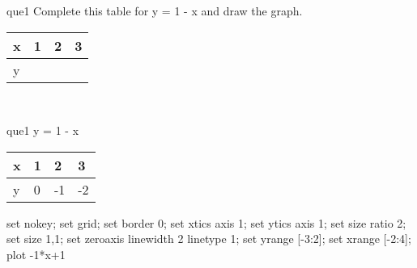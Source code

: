 \documentclass[13.5pt, varwidth=true]{beamer}
\begin{document}
\begin{frame}[shrink=19,fragile]
	\begin{beamercolorbox}[rounded=true, left, shadow=true,wd=14.8cm]{que1}
		 Complete this table for y = 1 - x and draw the graph. \\[0.3cm] \renewcommand{\arraystretch}{1.2}\begin{tabular}{|C|C|C|C|} \hline x & 1 & 2 & 3 \\ \hline y & & & \\ \hline \end{tabular}\\[0.3cm]
	\end{beamercolorbox}
\end{frame}
\begin{frame}[shrink=19,fragile]
	\begin{beamercolorbox}[rounded=true, left, shadow=true,wd=14.8cm]{que1}
		y = 1 - x\renewcommand{\arraystretch}{1.2}\begin{tabular}{|C|C|C|C|} \hline x & 1 & 2 & 3 \\ \hline y & 0 & -1 & -2\\ \hline \end{tabular}\begin{gnuplot}[terminal=pdf] set nokey; set grid; set border 0; set xtics axis 1; set ytics axis 1; set size ratio 2; set size 1,1; set zeroaxis linewidth 2 linetype 1; set yrange [-3:2]; set xrange [-2:4]; plot -1*x+1 \end{gnuplot}
	\end{beamercolorbox}
\end{frame}
\end{document}
